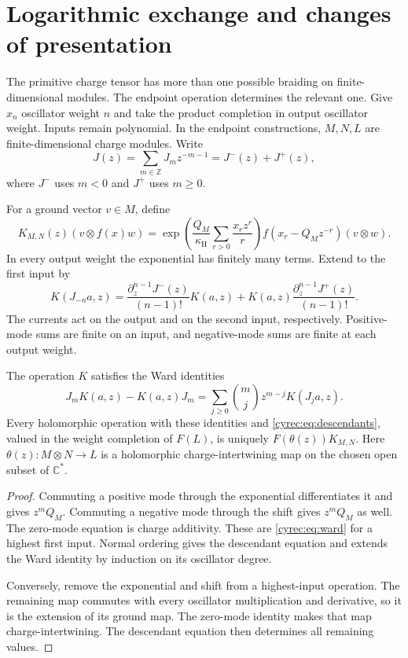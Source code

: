 \section{Logarithmic exchange and changes of presentation}

The primitive charge tensor has more than one possible braiding
on finite-dimensional modules. The endpoint operation determines
the relevant one. Give $x_n$ oscillator weight $n$ and take the
product completion in output oscillator weight. Inputs remain
polynomial. In the endpoint constructions, $M,N,L$ are
finite-dimensional charge modules. Write
\[
 J(z)=\sum_{m\in\mathbb Z}J_mz^{-m-1}=J^-(z)+J^+(z),
\]
where $J^-$ uses $m<0$ and $J^+$ uses $m\geq0$.

For a ground vector $v\in M$, define
\begin{equation}\label{cyrec:eq:endpoint}
 K_{M,N}(z)(v\otimes f(x)w)
 =\exp\left(\frac{Q_M}{\kappa_{\mathrm H}}
                       \sum_{r>0}\frac{x_rz^r}{r}\right)
       f(x_r-Q_Mz^{-r})(v\otimes w).
\end{equation}
In every output weight the exponential has finitely many terms.
Extend to the first input by
\begin{equation}\label{cyrec:eq:descendants}
 K(J_{-n}a,z)=
 \frac{\partial_z^{n-1}J^-(z)}{(n-1)!}K(a,z)
 +K(a,z)\frac{\partial_z^{n-1}J^+(z)}{(n-1)!}.
\end{equation}
The currents act on the output and on the second input,
respectively. Positive-mode sums are finite on an input, and
negative-mode sums are finite at each output weight.

\begin{proposition}\label{cyrec:prop:endpoint}
The operation $K$ satisfies the Ward identities
\begin{equation}\label{cyrec:eq:ward}
 J_mK(a,z)-K(a,z)J_m
 =\sum_{j\geq0}\binom mj z^{m-j}K(J_ja,z).
\end{equation}
Every holomorphic operation with these identities and
\eqref{cyrec:eq:descendants}, valued in the weight completion of
$F(L)$, is uniquely $F(\theta(z))K_{M,N}$.
Here $\theta(z):M\otimes N\to L$ is a holomorphic charge-intertwining
map on the chosen open subset of $\mathbb C^*$.
\end{proposition}

\begin{proof}
Commuting a positive mode through the exponential differentiates it
and gives $z^mQ_M$. Commuting a negative mode through the shift
gives $z^mQ_M$ as well. The zero-mode equation is charge additivity.
These are \eqref{cyrec:eq:ward} for a highest first input.
Normal ordering gives the descendant equation and extends the Ward
identity by induction on its oscillator degree.

Conversely, remove the exponential and shift from a highest-input
operation. The remaining map commutes with every oscillator
multiplication and derivative, so it is the extension of its ground
map. The zero-mode identity makes that map charge-intertwining.
The descendant equation then determines all remaining values.
\end{proof}


